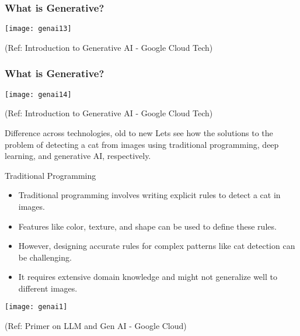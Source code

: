 \begin{frame}[fragile]\frametitle{What is Generative?}

\begin{center}
\texttt{[image: genai13]}
\end{center}


{\tiny (Ref: Introduction to Generative AI - Google Cloud Tech)}

\end{frame}

\begin{frame}[fragile]\frametitle{What is Generative?}

\begin{center}
\texttt{[image: genai14]}
\end{center}


{\tiny (Ref: Introduction to Generative AI - Google Cloud Tech)}

\end{frame}

\begin{frame}[fragile]{Difference across technologies, old to new}
Lets see how the solutions to the problem of detecting a cat from images using traditional programming, deep learning, and generative AI, respectively.
\end{frame}

\begin{frame}[fragile]{Traditional Programming}
  \begin{itemize}
    \item Traditional programming involves writing explicit rules to detect a cat in images.
    \item Features like color, texture, and shape can be used to define these rules.
    \item However, designing accurate rules for complex patterns like cat detection can be challenging.
    \item It requires extensive domain knowledge and might not generalize well to different images.
  \end{itemize}
  
\begin{center}
\texttt{[image: genai1]}
\end{center}

{\tiny (Ref: Primer on LLM and Gen AI - Google Cloud)}
  
\end{frame}


